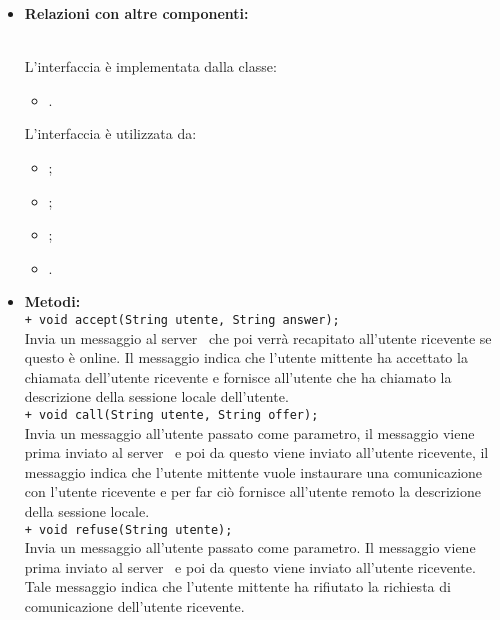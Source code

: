 {{\begin{sloppypar}
{{\begin{itemize}
				\item[] \textbf{Relazioni con altre componenti:}{\\
					L'interfaccia è implementata dalla classe:
					\begin{itemize}
						\item[] .
					\end{itemize}	  
					L'interfaccia è utilizzata da:
					\begin{itemize}
						\item[] ;
						\item[] ;
						\item[] ;
						\item[] .\\
					\end{itemize}
				}
			
				\item[] \textbf{Metodi:}{ \\
				\texttt{+ void accept(String utente, String answer);}\\
				Invia un messaggio al server\g~ che poi verrà recapitato all'utente ricevente se questo è online. Il messaggio indica che l'utente mittente ha accettato la chiamata dell'utente ricevente e fornisce all'utente che ha chiamato la descrizione della sessione locale dell'utente.\\

					\texttt{+ void call(String utente, String offer);}\\
					Invia un messaggio all'utente passato come parametro, il messaggio viene prima inviato al server\g~ e poi da questo viene inviato all'utente ricevente, il messaggio indica che l'utente mittente vuole instaurare una comunicazione con l'utente ricevente e per far ciò fornisce all'utente remoto la descrizione della sessione locale.\\

					\texttt{+ void refuse(String utente);}\\
					Invia un messaggio all'utente passato come parametro. Il messaggio viene prima inviato al server\g~ e poi da questo viene inviato all'utente ricevente. Tale messaggio indica che l'utente mittente ha rifiutato la richiesta di comunicazione dell'utente ricevente.\\

}
\end{itemize}}}
\end{sloppypar}}}
